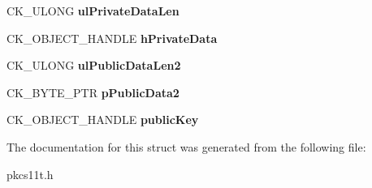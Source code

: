 \begin{DoxyCompactItemize}
C\+K\+\_\+\+U\+L\+O\+NG {\bfseries ul\+Private\+Data\+Len}
\item 
\mbox{\label{struct_c_k___x9__42___m_q_v___d_e_r_i_v_e___p_a_r_a_m_s_a202106581bbc13cd08cbff4f8f9df3df}} 
C\+K\+\_\+\+O\+B\+J\+E\+C\+T\+\_\+\+H\+A\+N\+D\+LE {\bfseries h\+Private\+Data}
\item 
\mbox{\label{struct_c_k___x9__42___m_q_v___d_e_r_i_v_e___p_a_r_a_m_s_a9b1100d4e5f10f069d19f499026bd17f}} 
C\+K\+\_\+\+U\+L\+O\+NG {\bfseries ul\+Public\+Data\+Len2}
\item 
\mbox{\label{struct_c_k___x9__42___m_q_v___d_e_r_i_v_e___p_a_r_a_m_s_ab63864d1ecfafc214c349cb7cbda1301}} 
C\+K\+\_\+\+B\+Y\+T\+E\+\_\+\+P\+TR {\bfseries p\+Public\+Data2}
\item 
\mbox{\label{struct_c_k___x9__42___m_q_v___d_e_r_i_v_e___p_a_r_a_m_s_a25bc899e09c2c9c65f97da51a6651c1f}} 
C\+K\+\_\+\+O\+B\+J\+E\+C\+T\+\_\+\+H\+A\+N\+D\+LE {\bfseries public\+Key}
\end{DoxyCompactItemize}


The documentation for this struct was generated from the following file\+:\begin{DoxyCompactItemize}
\item 
pkcs11t.\+h\end{DoxyCompactItemize}

